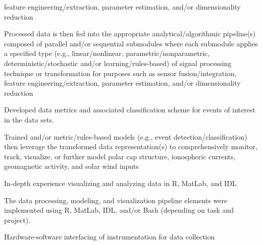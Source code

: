     feature engineering/extraction, parameter estimation, and/or 
    dimensionality reduction
  \item Processed data is then fed into the appropriate
    analytical/algorithmic pipeline(s) composed of parallel and/or
    sequential submodules where each submodule applies a specified type 
    (e.g., linear/nonlinear, parametric/nonparametric, deterministic/stochastic
    and/or learning/rules-based) of signal processing technique or transformation 
    for purposes such as sensor fusion/integration, feature engineering/extraction,
    parameter estimation, and/or dimensionality reduction
  \item Developed data metrics and associated classification scheme for
    events of interest in the data sets.
  \item Trained and/or metric/rules-based models (e.g., event
    detection/classification) then leverage the transformed data representation(s)
    to comprehensively monitor, track, visualize, or further model polar cap structure,
    ionospheric currents, geomagnetic activity, and solar wind inputs
  \item In-depth experience visualizing and analyzing data in R, MatLab,
    and IDL
  \item The data processing, modeling, and visualization pipeline
    elements were implemented using R, MatLab, IDL, and/or Bash
    (depending on task and project).
  \item Hardware-software interfacing of instrumentation for data
    collection


